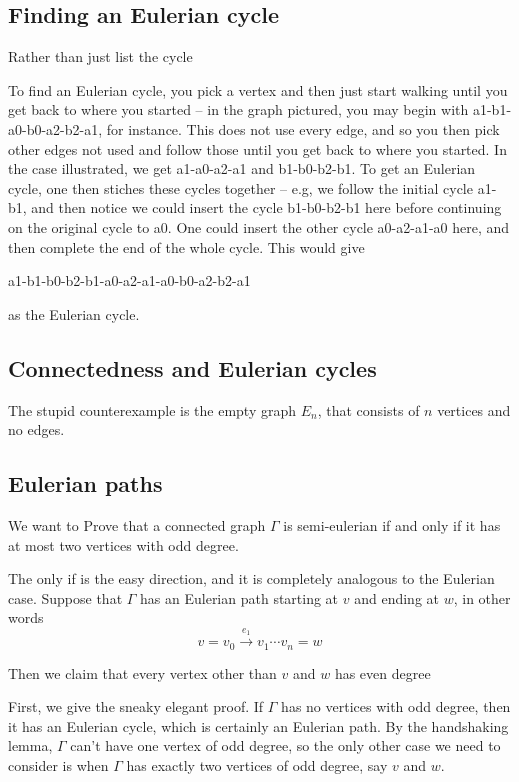 \documentclass{amsart}
\begin{document}
\subsection{Finding an Eulerian cycle}

Rather than just list the cycle 

To find an Eulerian cycle, you pick a vertex and then just start walking until you get back to where you started -- in the graph pictured, you may begin with a1-b1-a0-b0-a2-b2-a1, for instance.  This does not use every edge, and so you then pick other edges not used and follow those until you get back to where you started.  In the case illustrated, we get a1-a0-a2-a1 and b1-b0-b2-b1.  To get an Eulerian cycle, one then stiches these cycles together -- e.g, we follow the initial cycle a1-b1, and then notice we could insert the cycle b1-b0-b2-b1 here before continuing on the original cycle to a0.  One could insert the other cycle a0-a2-a1-a0 here, and then complete the end of the whole cycle.  This would give

a1-b1-b0-b2-b1-a0-a2-a1-a0-b0-a2-b2-a1

as the Eulerian cycle.


\subsection{Connectedness and Eulerian cycles}

The stupid counterexample is the empty graph $E_n$, that consists of $n$ vertices and no edges.


\subsection{Eulerian paths}

We want to Prove that a connected graph $\Gamma$ is semi-eulerian if and only if it has at most two vertices with odd degree.



  The only if is the easy direction, and it is completely analogous to the Eulerian case.  Suppose that $\Gamma$ has an Eulerian path starting at $v$ and ending at $w$, in other words
  $$v=v_0\stackrel{e_1}{\to} v_1 \cdots v_n=w$$


  Then we claim that every vertex other than $v$ and $w$ has even degree


  
  First, we give the sneaky elegant proof.  If $\Gamma$ has no vertices with odd degree, then it has an Eulerian cycle, which is certainly an Eulerian path.  By the handshaking lemma, $\Gamma$ can't have one vertex of odd degree, so the only other case we need to consider is when $\Gamma$ has exactly two vertices of odd degree, say $v$ and $w$.  
\end{document}
